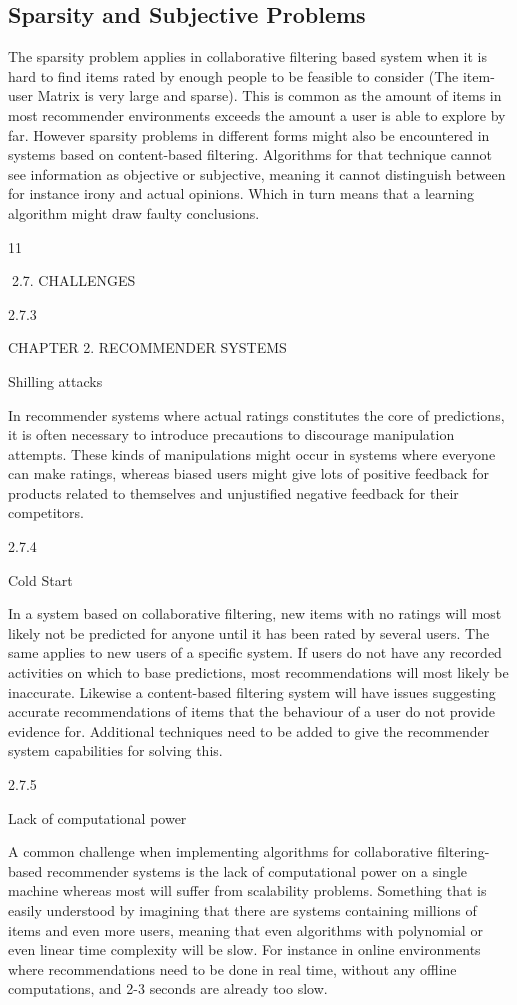 \subsection{Sparsity and Subjective Problems}
The sparsity problem applies in collaborative filtering based system when it is hard to
find items rated by enough people to be feasible to consider (The item-user Matrix is
very large and sparse). This is common as the amount of items in most recommender
environments exceeds the amount a user is able to explore by far. However sparsity
problems in different forms might also be encountered in systems based on content-based
filtering. Algorithms for that technique cannot see information as objective or subjective,
meaning it cannot distinguish between for instance irony and actual opinions. Which in
turn means that a learning algorithm might draw faulty conclusions.

11

2.7. CHALLENGES

2.7.3

CHAPTER 2. RECOMMENDER SYSTEMS

Shilling attacks

In recommender systems where actual ratings constitutes the core of predictions, it is
often necessary to introduce precautions to discourage manipulation attempts. These
kinds of manipulations might occur in systems where everyone can make ratings, whereas
biased users might give lots of positive feedback for products related to themselves and
unjustified negative feedback for their competitors.

2.7.4

Cold Start

In a system based on collaborative filtering, new items with no ratings will most likely
not be predicted for anyone until it has been rated by several users. The same applies
to new users of a specific system. If users do not have any recorded activities on which
to base predictions, most recommendations will most likely be inaccurate. Likewise a
content-based filtering system will have issues suggesting accurate recommendations of
items that the behaviour of a user do not provide evidence for. Additional techniques
need to be added to give the recommender system capabilities for solving this.

2.7.5

Lack of computational power

A common challenge when implementing algorithms for collaborative filtering-based recommender systems is the lack of computational power on a single machine whereas most
will suffer from scalability problems. Something that is easily understood by imagining that there are systems containing millions of items and even more users, meaning
that even algorithms with polynomial or even linear time complexity will be slow. For
instance in online environments where recommendations need to be done in real time,
without any offline computations, and 2-3 seconds are already too slow.

